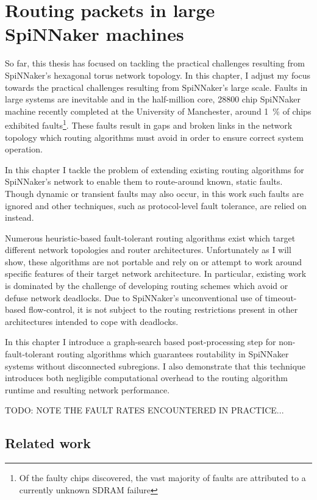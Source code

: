 \chapter{Routing packets in large SpiNNaker machines}
	
	So far, this thesis has focused on tackling the practical challenges
	resulting from SpiNNaker's hexagonal torus network topology. In this chapter,
	I adjust my focus towards the practical challenges resulting from SpiNNaker's
	large scale. Faults in large systems are inevitable and in the half-million
	core, \num{28800} chip SpiNNaker machine recently completed at the University
	of Manchester, around \SI{1}{\percent} of chips exhibited faults\footnote{Of
	the faulty chips discovered, the vast majority of faults are attributed to a
	currently unknown SDRAM failure}. These faults result in gaps and broken
	links in the network topology which routing algorithms must avoid in order to
	ensure correct system operation.
	
	In this chapter I tackle the problem of extending existing routing algorithms
	for SpiNNaker's network to enable them to route-around known, static faults.
	Though dynamic or transient faults may also occur, in this work such faults
	are ignored and other techniques, such as protocol-level fault tolerance, are
	relied on instead.
	
	Numerous heuristic-based fault-tolerant routing algorithms exist which target
	different network topologies and router architectures. Unfortunately as I
	will show, these algorithms are not portable and rely on or attempt to work
	around specific features of their target network architecture. In particular,
	existing work is dominated by the challenge of developing routing schemes
	which avoid or defuse network deadlocks. Due to SpiNNaker's unconventional
	use of timeout-based flow-control, it is not subject to the routing
	restrictions present in other architectures intended to cope with deadlocks.
	
	In this chapter I introduce a graph-search based post-processing step for
	non-fault-tolerant routing algorithms which guarantees routability in
	SpiNNaker systems without disconnected subregions. I also demonstrate that
	this technique introduces both negligible computational overhead to the
	routing algorithm runtime and resulting network performance.
	
	TODO: NOTE THE FAULT RATES ENCOUNTERED IN PRACTICE...
	
	\section{Related work}
		
